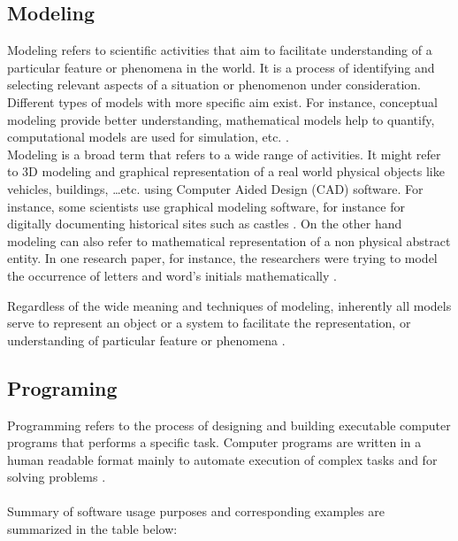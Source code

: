 \subsection{Modeling}
\label{sec:purpose:Types:Modelling}

Modeling refers to scientific activities that aim to facilitate understanding of a particular feature or phenomena in the world. It is a process of identifying and selecting relevant aspects of a situation or phenomenon under consideration. Different types of models with more specific aim exist.  For instance, conceptual modeling provide better understanding, mathematical models help to quantify, computational models are used for simulation, etc. \citep{enwiki:1051627717}.\\

Modeling is a broad term that refers to a wide range of activities. It might refer to 3D modeling and graphical representation of a real world physical objects like vehicles, buildings, …etc.  using Computer Aided Design (CAD) software. For instance, some scientists use graphical modeling software, for instance for digitally documenting historical sites such as castles \citep{el2007detailed}. On the other hand modeling can also refer to mathematical representation of a non physical abstract entity. In one research paper, for instance, the researchers were trying to model the occurrence of letters and word’s initials mathematically \citep{pande2010mathematical}. 

Regardless of the wide meaning and techniques of modeling, inherently all models serve to represent an object or a system to facilitate the representation, or understanding of particular feature or phenomena \citep{enwiki:1058944086, enwiki:1051627717}.  


\subsection{Programing}
\label{sec:purpose:Types:Programing}
Programming refers to the process of designing and building executable computer programs that performs a specific task. Computer programs are written in a human readable format mainly to automate execution of complex tasks and for solving problems \citep{enwiki:1062649903}. \\
\\

Summary of software usage purposes and corresponding examples are summarized in the table below:

